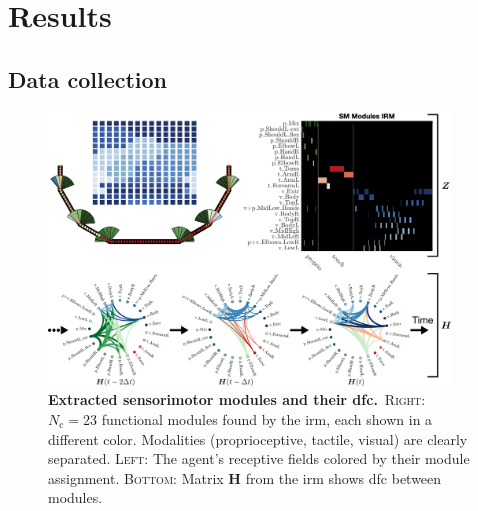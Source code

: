 \documentclass[letterpaper, 10 pt, conference]{ieeeconf}  %
\begin{document}
\section{Results}

\subsection{Data collection}
\begin{figure}[t!]
    \centering
    \includegraphics[width=0.95\textwidth]{fig/irm_results_figure_v2.png}
    \vspace{5pt}
    \caption{\textbf{Extracted sensorimotor modules and their \ac{dfc}.}~\textsc{Right}: $N_\text{c}=23$ functional modules found by the \ac{irm}, each shown in a different color. Modalities (proprioceptive, tactile, visual) are clearly separated. \textsc{Left}: The agent's receptive fields colored by their module assignment. \textsc{Bottom}: Matrix $\bm{H}$ from the \ac{irm} shows \ac{dfc} between modules.}
    \label{fig:irm_modules}
    \vspace{-15pt}
\end{figure}
\end{document}
